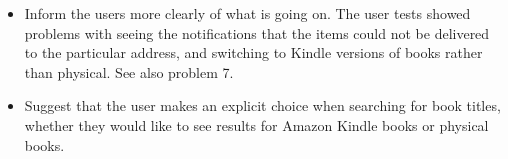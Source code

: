 \begin{enumerate}[a.]
\begin{itemize}
\item Inform the users more clearly of what is going on. The user tests showed
problems with seeing the notifications that the items could not be delivered to
the particular address, and switching to Kindle versions of books rather than
physical. See also problem 7.

\item Suggest that the user makes an explicit choice when searching for book
titles, whether they would like to see results for Amazon Kindle books or
physical books.

\end{itemize}

\end{enumerate}

